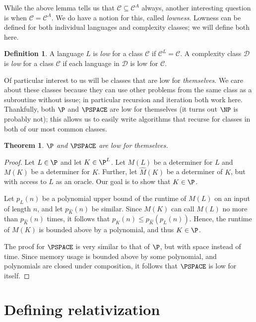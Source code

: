 \documentclass[english,12pt]{reedthesis}
\theoremstyle{plain}
\newtheorem{thm}{Theorem}[section]
\theoremstyle{definition}
\newtheorem{defn}[defn]{Definition}
\theoremstyle{remark}
\begin{document}
While the above lemma tells us that $\mathcal{C} \subseteq \mathcal{C}^{A}$ always, another interesting
question is when $\mathcal{C} = \mathcal{C}^{A}$. We do have a notion for this, called
\emph{lowness}. Lowness can be defined for both individual languages and
complexity classes; we will define both here.

\begin{defn}\label{def:low}
  A language $L$ is \emph{low} for a class $\mathcal{C}$ if $\mathcal{C}^{L} = \mathcal{C}$. A complexity
  class $\mathcal{D}$ is \emph{low} for a class $\mathcal{C}$ if each language in $\mathcal{D}$ is low for
  $\mathcal{C}$.
\end{defn}

Of particular interest to us will be classes that are low for \emph{themselves}.
We care about these classes because they can use other problems from the same
class as a subroutine without issue; in particular recursion and iteration both
work here. Thankfully, both $\P$ and $\PSPACE$ are low for themselves (it turns
out $\NP$ is probably not); this allows us to easily write algorithms that
recurse for classes in both of our most common classes.

\begin{thm}\label{thm:p-pspace-low}
  $\P$ and $\PSPACE$ are low for themselves.
\end{thm}

\begin{proof}
  Let $L \in \P$ and let $K \in \P^{L}$. Let $M(L)$ be a determiner for $L$ and
  $M(K)$ be a determiner for $K$. Further, let $\hat{M}(K)$ be a determiner of
  $K$, but with access to $L$ as an oracle. Our goal is to show that $K \in \P$.

  Let $p_{L}(n)$ be a polynomial upper bound of the runtime of $M(L)$ on an
  input of length $n$, and let $p_{\hat{K}}(n)$ be similar. Since $M(K)$ can
  call $M(L)$ no more than $p_{\hat{K}}(n)$ times, it follows that
  $p_{K}(n) \le p_{\hat{K}}(p_{L}(n))$. Hence, the runtime of $M(K)$ is bounded
  above by a polynomial, and thus $K \in \P$.

  The proof for $\PSPACE$ is very similar to that of $\P$, but with space
  instead of time. Since memory usage is bounded above by some polynomial, and
  polynomials are closed under composition, it follows that $\PSPACE$ is low for
  itself.
\end{proof}

\section{Defining relativization}
\end{document}
